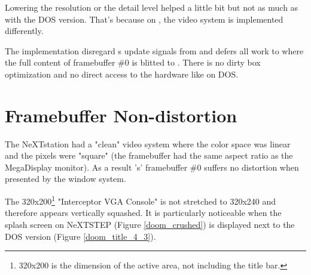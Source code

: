 \par
Lowering the resolution or the detail level helped a little bit but not as much as with the DOS version. That's because on \NeXTns{}, the video system is implemented differently.\\
\par
 The implementation disregard   s update signals from  and defers all work to  where the full content of framebuffer \#0 is blitted to . There is no dirty box optimization and no direct access to the hardware like on DOS.\\
\par
{}

\section{Framebuffer Non-distortion}
The NeXTstation had a "clean" video system where the color space was linear and the pixels were "square" (the framebuffer had the same aspect ratio as the MegaDisplay monitor). As a result \doom{}'s' framebuffer \#0 suffers no distortion when presented by the window system.\\
\par
The 320x200\footnote{320x200 is the dimension of the active area, not including the title bar.} "Interceptor VGA Console"  is not stretched to 320x240 and therefore appears vertically squashed. It is particularly noticeable when the splash screen on NeXTSTEP (Figure \ref{doom_crushed}) is displayed next to the DOS version (Figure \ref{doom_title_4_3}).\\
\par
{}
\par
{}
\par
{}
